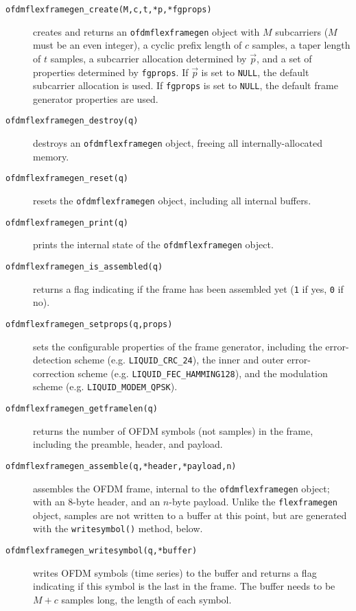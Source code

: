 \begin{description}
%
\item[{\tt ofdmflexframegen\_create(M,c,t,*p,*fgprops)}]
    creates and returns an {\tt ofdmflexframegen} object
    with $M$ subcarriers ($M$ must be an even integer),
    a cyclic prefix length of $c$ samples,
    a taper length of $t$ samples,
    a subcarrier allocation determined by $\vec{p}$,
    and a set of properties determined by {\tt fgprops}.
    If $\vec{p}$ is set to {\tt NULL}, the default subcarrier allocation
    is used.
    If {\tt fgprops} is set to {\tt NULL}, the default frame generator
    properties are used.
%
\item[{\tt ofdmflexframegen\_destroy(q)}]
    destroys an {\tt ofdmflexframegen} object, freeing all
    internally-allocated memory.
%
\item[{\tt ofdmflexframegen\_reset(q)}]
    resets the {\tt ofdmflexframegen} object, including all internal
    buffers.
%
\item[{\tt ofdmflexframegen\_print(q)}]
    prints the internal state of the {\tt ofdmflexframegen} object.
%
\item[{\tt ofdmflexframegen\_is\_assembled(q)}]
    returns a flag indicating if the frame has been assembled yet
    ({\tt 1} if yes, {\tt 0} if no).
%
\item[{\tt ofdmflexframegen\_setprops(q,props)}]
    sets the configurable properties of the frame generator, including
    the error-detection scheme (e.g. {\tt LIQUID\_CRC\_24}),
    the inner and outer error-correction scheme (e.g. {\tt LIQUID\_FEC\_HAMMING128}),
    and the modulation scheme (e.g. {\tt LIQUID\_MODEM\_QPSK}).
%
\item[{\tt ofdmflexframegen\_getframelen(q)}]
    returns the number of OFDM symbols (not samples) in the frame,
    including the preamble, header, and payload.
%
\item[{\tt ofdmflexframegen\_assemble(q,*header,*payload,n)}]
    assembles the OFDM frame, internal to the {\tt ofdmflexframegen}
    object; with an 8-byte header, and an $n$-byte payload.
    Unlike the {\tt flexframegen} object, samples are not written to a
    buffer at this point, but are generated with the
    {\tt writesymbol()} method, below.
%
\item[{\tt ofdmflexframegen\_writesymbol(q,*buffer)}]
    writes OFDM symbols (time series) to the buffer and returns a flag
    indicating if this symbol is the last in the frame.
    The buffer needs to be $M+c$ samples long, the length of each
    symbol.
%
\end{description}


